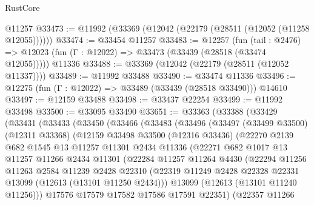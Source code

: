 \begin{lexlean}{RustCore}
\begin{coremodule}
    @11257
@33473 := @11992 (@33369 (@12042 (@22179 (@28511 (@12052 (@11258 @12055))))))
@33474 := @33454 @11257
@33483 := @12257
    (fun (tail : @2476) => @12023 (fun (Γ : @12022) => @33473 (@33439 (@28518 (@33474 @12055)))))
    @11336
@33488 := @33369 (@12042 (@22179 (@28511 (@12052 @11337))))
@33489 := @11992 @33488
@33490 := @33474 @11336
@33496 := @12275 (fun (Γ : @12022) => @33489 (@33439 (@28518 @33490))) @14610
@33497 := @12159 @33488
@33498 := @33437 @22254
@33499 := @11992 @33498
@33500 := @33095 @33490
@33651 := @33363
    (@33388
      (@33429
        (@33431
          (@33433
            (@33450
              (@33466
                (@33483
                  (@33496
                    (@33497
                      (@33499 @33500)
                      (@12311 @33368)
                      (@12159
                        @33498
                        @33500
                        (@12316 @33436)
                        (@22270
                          @2139
                          @682
                          @1545
                          @13
                          @11257
                          @11301
                          @2434
                          @11336
                          (@22271
                            @682
                            @1017
                            @13
                            @11257
                            @11266
                            @2434
                            @11301
                            (@22284
                              @11257
                              @11264
                              @4430
                              (@22294
                                @11256
                                @11263
                                @2584
                                @11239
                                @2428
                                @22310
                                (@22319
                                  @11249
                                  @2428
                                  @22328
                                  @22331
                                  @13099
                                  (@12613 (@13101 @11250 @2434)))
                                @13099
                                (@12613 (@13101 @11240 @11256)))
                              @17576
                              @17579
                              @17582
                              @17586
                              @17591
                              @22351)
                            (@22357
                              @11266

\end{coremodule}
\end{lexlean}
